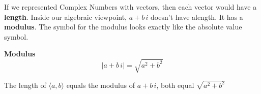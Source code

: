 \documentclass{ximera}
\begin{document}
If we represented Complex Numbers with vectors, then each vector would have a \textbf{length}.  Inside our algebraic viewpoint, $a + b \, i$ doesn't have alength. It has a \textbf{modulus}.  The symbol for the modulus looks exactly like the absolute value symbol.

\begin{definition} \textbf{\textcolor{green!50!black}{Modulus}} \\
\[      |a + b \, i|    = \sqrt{a^2 + b^2}   \]
\end{definition}

The length of $\langle a, b \rangle$ equals the modulus of $a + b \, i$, both equal $\sqrt{a^2 + b^2}$
\end{document}
